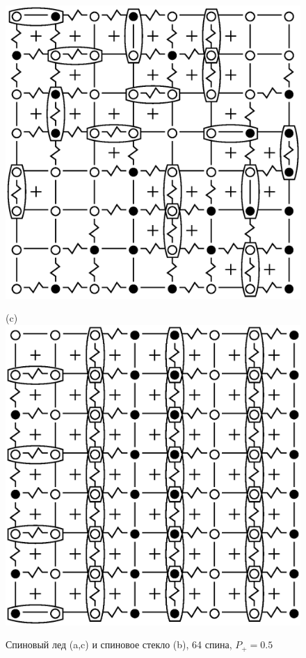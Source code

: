 \documentclass[utf8, babel, sor, jor, amsmath, amssymb, reprint]{elsarticle} %
\begin{document}
\begin{figure}[H]
\begin{minipage}[h]{0.3\linewidth}
	\includegraphics[width=1\linewidth]{pictures/SG_64_J0}
	\end{minipage}
	\hfill
	\begin{minipage}[h]{0.3\linewidth}
		\centering(c)
		\includegraphics[width=1\linewidth]{pictures/SI_64_J0}
	\end{minipage}
	\hfill
	\caption{Спиновый лед (a,c) и спиновое стекло (b), 64 спина, $P_+ = 0.5$}
	\label{fig:cell_SI_SG_64}

\end{figure}
\end{document}
